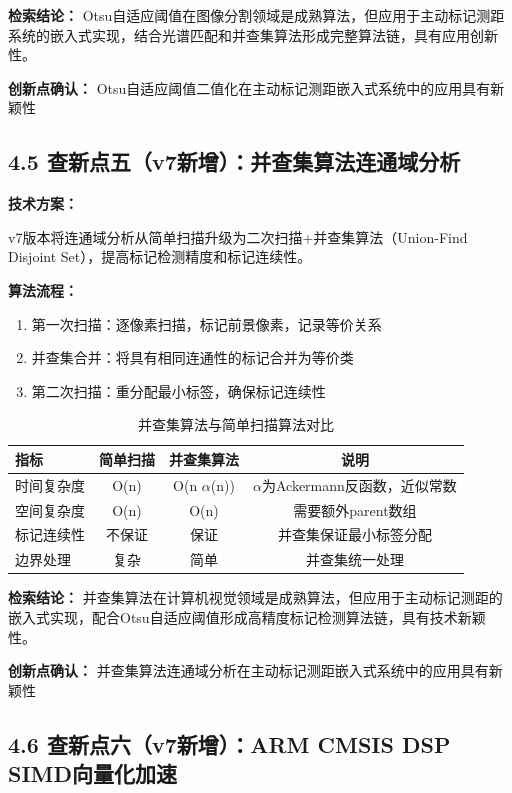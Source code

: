 \documentclass[12pt,a4paper]{article}
\begin{document}
\textbf{检索结论：} Otsu自适应阈值在图像分割领域是成熟算法，但应用于主动标记测距系统的嵌入式实现，结合光谱匹配和并查集算法形成完整算法链，具有应用创新性。

\textbf{创新点确认：} Otsu自适应阈值二值化在主动标记测距嵌入式系统中的应用具有新颖性

\subsection{4.5 查新点五（v7新增）：并查集算法连通域分析}

\textbf{技术方案：}

v7版本将连通域分析从简单扫描升级为二次扫描+并查集算法（Union-Find Disjoint Set），提高标记检测精度和标记连续性。

\textbf{算法流程：}
\begin{enumerate}
\item 第一次扫描：逐像素扫描，标记前景像素，记录等价关系
\item 并查集合并：将具有相同连通性的标记合并为等价类
\item 第二次扫描：重分配最小标签，确保标记连续性
\end{enumerate}

\begin{table}[H]
\centering
\caption{并查集算法与简单扫描算法对比}
\begin{tabular}{lccc}
\toprule
指标 & 简单扫描 & 并查集算法 & 说明 \\
\midrule
时间复杂度 & O(n) & O(n $\alpha$(n)) & $\alpha$为Ackermann反函数，近似常数 \\
空间复杂度 & O(n) & O(n) & 需要额外parent数组 \\
标记连续性 & 不保证 & 保证 & 并查集保证最小标签分配 \\
边界处理 & 复杂 & 简单 & 并查集统一处理 \\
\bottomrule
\end{tabular}
\end{table}

\textbf{检索结论：} 并查集算法在计算机视觉领域是成熟算法，但应用于主动标记测距的嵌入式实现，配合Otsu自适应阈值形成高精度标记检测算法链，具有技术新颖性。

\textbf{创新点确认：} 并查集算法连通域分析在主动标记测距嵌入式系统中的应用具有新颖性

\subsection{4.6 查新点六（v7新增）：ARM CMSIS DSP SIMD向量化加速}
\end{document}
